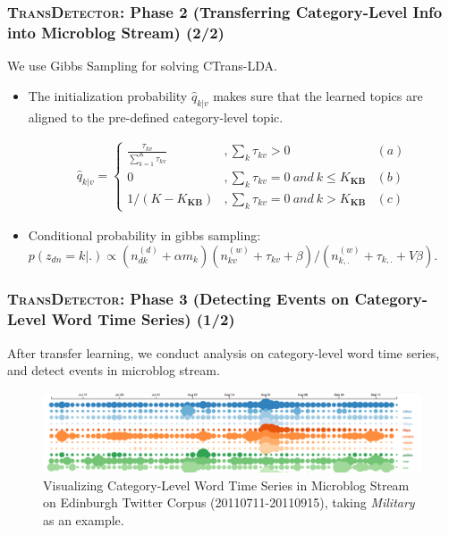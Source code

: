 \documentclass{beamer}
\begin{document}
\begin{frame}
\frametitle{\textsc{TransDetector}: Phase 2 (Transferring Category-Level Info into Microblog Stream) (2/2)}	
We use Gibbs Sampling for solving CTrans-LDA.
\begin{itemize}
	\item The initialization probability \(\hat{q}_{k|v}\) makes sure that the learned topics are aligned to the pre-defined category-level topic.
\setlength{\abovedisplayskip}{0pt}
\setlength{\belowdisplayskip}{0pt}
\begin{scriptsize} 
\begin{equation}
\label{eq:initProbability}
\begin{aligned}
\hat{q}_{k|v}=
\left\{ \begin{aligned}
\frac{\tau_{kv}}{\sum_{k=1}^{K}\tau_{kv}} &,\sum_{k}\tau_{kv}>0 & (a)\\
0&, \sum_{k}\tau_{kv}=0 \ and \ k \leq K_{\bm{KB}} & (b)\\
1/(K-K_{\bm{KB}})&,\sum_{k}\tau_{kv}=0 \ and \ k > K_{\bm{KB}} & (c)
\end{aligned}\right.
\end{aligned}
\end{equation}
\end{scriptsize}
\item Conditional probability in gibbs sampling:
\(p(z_{dn}=k|.)\propto (n^{(d)}_{dk}+\alpha m_k)(n^{(w)}_{kv}+\tau_{kv}+\beta)/(n^{(w)}_{k,.}+\tau_{k,.}+V\beta)\).
\end{itemize}

\end{frame}


\begin{frame}
\frametitle{\textsc{TransDetector}: Phase 3 (Detecting Events on Category-Level Word Time Series) (1/2)}	
After transfer learning, we conduct analysis on category-level word time series, and detect events in microblog stream.
\begin{figure}[h]
		\setlength{\abovecaptionskip}{0.cm}
        \setlength{\belowcaptionskip}{0.cm}
        \centering
        \includegraphics[width=.99\columnwidth]{img/screenShot.png}
        \caption{Visualizing Category-Level Word Time Series in Microblog Stream on Edinburgh Twitter Corpus (20110711-20110915), taking \textit{Military} as an example.}
        \label{fig:hood}
\end{figure}
\end{frame}
\end{document}
